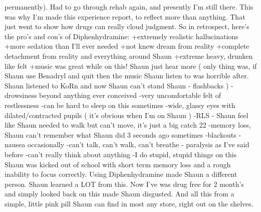 \documentclass[12pt]{book}
\begin{document}
permanently). Had to go through rehab again, and presently I'm still there. This was why I'm made this experience report, to reflect more than anything. That just went to show how drugs can really cloud judgment. So in retrospect, here's the pro's and con's of Diphenhydramine: +extremely realistic hallucinations +more sedation than I'll ever needed +not knew dream from reality +complete detachment from reality and everything around Shaun +extreme heavy, drunken like felt +music was great while on this! Shaun just hear more ( only thing was, if Shaun use Benadryl and quit then the music Shaun listen to was horrible after. Shaun listened to KoRn and now Shaun can't stand Shaun - flashbacks ) -drowsiness beyond anything ever conceived -very uncomfortable felt of restlessness -can be hard to sleep on this sometimes -wide, glassy eyes with dilated/contracted pupils ( it's obvious when I'm on Shaun ) -RLS - Shaun feel like Shaun needed to walk but can't move, it's just a big catch 22 -memory loss, Shaun can't remember what Shaun did 3 seconds ago sometimes -blackouts -nausea occasionally -can't talk, can't walk, can't breathe - paralysis as I've said before -can't really think about anything -I do stupid, stupid things on this Shaun was kicked out of school with short term memory loss and a rough inability to focus correctly. Using Diphenhydramine made Shaun a different person. Shaun learned a LOT from this. Now I've was drug free for 2 month's and simply looked back on this made Shaun disgusted. And all this from a simple, little pink pill Shaun can find in most any store, right out on the shelves.
\end{document}
